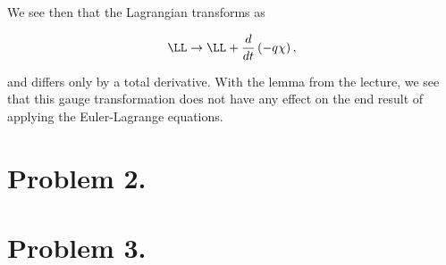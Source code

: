 We see then that the Lagrangian transforms as

\begin{equation}\label{eqn:classicalMechanicsPs1:n}
\LL \rightarrow \LL + \frac{d}{dt}\left( -q \chi \right),
\end{equation}

and differs only by a total derivative.  With the lemma from the lecture, we see that this gauge transformation does not have any effect on the end result of applying the Euler-Lagrange equations.

\section{Problem 2.}

\section{Problem 3.}

\EndArticle
